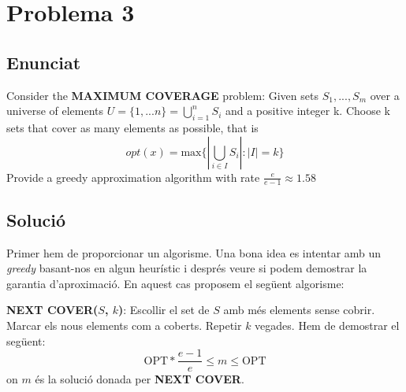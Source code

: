 \section{Problema 3}
\subsection{Enunciat}
Consider the \textbf{MAXIMUM COVERAGE} problem: Given sets $S_1,...,S_m$ over a universe of elements $U = \{1,...n\} = \bigcup_{i=1}^{n} S_i$ and a positive integer k. Choose k sets that cover as many elements as possible, that is \[
opt(x) = \text{max}\{|\bigcup_{i \in I} S_i| : |I| = k\}
\]
Provide a greedy approximation algorithm with rate $\frac{e}{e-1} \approx 1.58$
\subsection{Solució}
Primer hem de proporcionar un algorisme. Una bona idea es intentar amb un \textit{greedy} basant-nos en algun heurístic i després veure si podem demostrar la garantia d'aproximació.
En aquest cas proposem el següent algorisme:
\newline
\par
\textbf{NEXT COVER($S$, $k$)}: Escollir el set de $S$ amb més elements sense cobrir. Marcar els nous elements com a coberts. Repetir $k$ vegades.
\newline
\newline
Hem de demostrar el següent:
\[
\text{OPT}*\frac{e-1}{e} \leq m \leq \text{OPT}
\]
on $m$ és la solució donada per \textbf{NEXT COVER}.
\newpage
